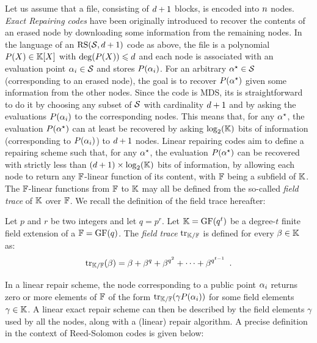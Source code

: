 \documentclass{llncs}
\begin{document}
Let us assume that a file, consisting of $\order + 1$ blocks, is encoded into $\nbShares$ nodes. {\em Exact Repairing codes} have been originally introduced to recover the contents of an erased node by downloading some information from the remaining nodes. In the language of an $\RS[\pubSet,\order+1]$ code as above, the file is a polynomial $P(X)\in \Field[X]$ with $\deg(P(X)) \leqslant \order$ and each node is associated with an evaluation point $\pubElt \in \pubSet$ and stores $P(\pubElt)$. For an arbitrary $\pubEltStar\in \pubSet$ (corresponding to an erased node), the goal is to recover $P(\pubEltStar)$ given some information from the other nodes. Since the code is MDS, its is straightforward to do it by choosing any subset of $\pubSet$ with cardinality $\order + 1$ and by asking the evaluations $P(\pubElt)$ to the corresponding nodes. This means that, for any $\pubEltStar$, the evaluation $P(\pubEltStar)$ can at least be recovered by asking $\log_2(\Field)$ bits of information (corresponding to $P(\pubElt)$) to $\order +1$ nodes. Linear repairing codes aim to define a repairing scheme such that, for any $\pubEltStar$, the evaluation $P(\pubEltStar)$ can be recovered with strictly less than $(\order + 1)\times \log_2(\Field)$ bits of information, by allowing each node to return any $\FField$-linear function of its content, with $\FField$ being a subfield of $\Field$. The $\FField$-linear functions from $\FField$ to $\Field$ may all be defined from the so-called {\em field trace} of $\Field$ over $\FField$. We recall the definition of the field trace hereafter:

\begin{definition}
Let $p$ and $r$ be two integers and let $q=p^r$. Let $\Field=\GF(q^t)$ be a degree-$t$ finite field extension of a $\FField=\GF(q)$. The {\em field trace} $\myTrace$ is defined for every $\beta \in \Field$ as:
\begin{equation}\label{equ:trace}
\myTrace(\beta) = \beta + \beta^q + \beta^{q^2} + \cdots + \beta^{q^{t-1}} \enspace .
\end{equation}
\end{definition}

In a linear repair scheme, the node corresponding to a public point $\pubElt$ returns zero or more elements of $\FField$ of the form $\myTrace(\gamma P(\pubElt))$ for some field elements $\gamma \in \Field$. A linear exact repair scheme can then be described by the field elements $\gamma$ used by all the nodes, along with a (linear) repair algorithm. A precise definition in the context of Reed-Solomon codes is given below:
\end{document}

